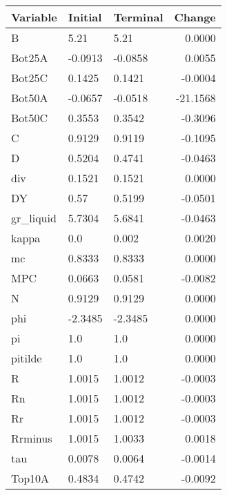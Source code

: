 \begin{table}
\centering
\label{tab:stst_comparison_fast_shock_wedge_permanent}
\begin{tabular}{lllr}
\toprule
                Variable & Initial & Terminal &   Change \\
\midrule
                       B &    5.21 &     5.21 &   0.0000 \\
                  Bot25A & -0.0913 &  -0.0858 &   0.0055 \\
                  Bot25C &  0.1425 &   0.1421 &  -0.0004 \\
                  Bot50A & -0.0657 &  -0.0518 & -21.1568 \\
                  Bot50C &  0.3553 &   0.3542 &  -0.3096 \\
                       C &  0.9129 &   0.9119 &  -0.1095 \\
                       D &  0.5204 &   0.4741 &  -0.0463 \\
                     div &  0.1521 &   0.1521 &   0.0000 \\
                      DY &    0.57 &   0.5199 &  -0.0501 \\
               gr\_liquid &  5.7304 &   5.6841 &  -0.0463 \\
                   kappa &     0.0 &    0.002 &   0.0020 \\
                      mc &  0.8333 &   0.8333 &   0.0000 \\
                     MPC &  0.0663 &   0.0581 &  -0.0082 \\
                       N &  0.9129 &   0.9129 &   0.0000 \\
                     phi & -2.3485 &  -2.3485 &   0.0000 \\
                      pi &     1.0 &      1.0 &   0.0000 \\
                 pitilde &     1.0 &      1.0 &   0.0000 \\
                       R &  1.0015 &   1.0012 &  -0.0003 \\
                      Rn &  1.0015 &   1.0012 &  -0.0003 \\
                      Rr &  1.0015 &   1.0012 &  -0.0003 \\
                 Rrminus &  1.0015 &   1.0033 &   0.0018 \\
                     tau &  0.0078 &   0.0064 &  -0.0014 \\
                  Top10A &  0.4834 &   0.4742 &  -0.0092 \\

\end{tabular}
\end{table}
